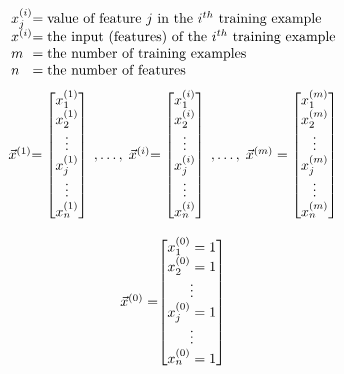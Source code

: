 \[
	\begin{array}{ l@{} l@{} } 
		x_j^{(i)} & = 
		\text{value of feature } j \text{ in the }i^{th}\text{ training example} \\
		x^{(i)} & = \text{the input (features) of the }i^{th}\text{ training example} \\
		m &= \text{the number of training examples} \\
		n &= \text{the number of features} \\
	\end{array}
\]
\[
	\begin{array}{ l@{} l@{} l@{} l@{} l@{}} 
		\vec{x}^{(1)} & = 
		\begin{bmatrix}
			x_{1}^{(1)} \\
			x_{2}^{(1)} \\
			\vdots \\
			x_{j}^{(1)} \\
			\vdots \\
			x_{n}^{(1)} \\
		\end{bmatrix} 
		\; , \ldots , \; 
		\vec{x}^{(i)} & = 
		\begin{bmatrix}
			x_{1}^{(i)} \\
			x_{2}^{(i)} \\
			\vdots \\
			x_{j}^{(i)} \\
			\vdots \\
			x_{n}^{(i)} \\
		\end{bmatrix} 
		\; , \ldots , \;
		\vec{x}^{(m)} = 
		\begin{bmatrix}
			x_{1}^{(m)} \\
			x_{2}^{(m)} \\
			\vdots \\
			x_{j}^{(m)} \\
			\vdots \\
			x_{n}^{(m)} \\
		\end{bmatrix} 
	\end{array}
\]


\[
	\begin{array}{ l@{} l@{} } 
	\vec{x}^{(0)} = &
		\begin{bmatrix}
			x_{1}^{(0)} = 1 \\
			x_{2}^{(0)} = 1 \\
			\vdots \\
			x_{j}^{(0)} = 1 \\
			\vdots \\
			x_{n}^{(0)} = 1 \\
		\end{bmatrix} 
	\end{array}
\]

